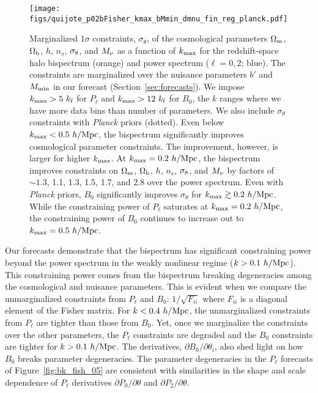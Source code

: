 \begin{figure}
\begin{center}
    \texttt{[image: figs/quijote\_p02bFisher\_kmax\_bMmin\_dmnu\_fin\_reg\_planck.pdf]} 
    \caption{Marginalized $1\sigma$ constraints, $\sigma_\theta$, of the cosmological 
    parameters $\Omega_{\rm m}$, $\Omega_{\rm b}$, $h$, $n_s$, $\sigma_8$, and $M_\nu$ as a function 
    of $k_{\rm max}$ for the redshift-space halo bispectrum (orange) and power 
    spectrum ($\ell = 0, 2$; blue). The constraints are marginalized over the nuisance parameters 
    $b'$ and $M_{\rm min}$ in our forecast (Section~\ref{sec:forecasts}). We impose 
    $k_{\rm max} > 5~k_{\rm f}$ for $P_\ell$ and $k_{\rm max} > 12~k_{\rm f}$ 
    for $B_0$, the $k$ ranges where we have more data bins than number of parameters. 
    We also include $\sigma_\theta$ constraints with {\em Planck} priors (dotted). 
    Even below $k_{\rm max} < 0.5~h/{\rm Mpc}$, the bispectrum significantly 
    improves cosmological parameter constraints. The improvement, however, is larger 
    for higher $k_{\rm max}$. At $k_{\rm max} = 0.2~h/{\rm Mpc}$, the bispectrum 
    improves constraints on $\Omega_{\rm m}$, $\Omega_{\rm b}$, $h$, $n_s$, $\sigma_8$, and $M_\nu$ by factors 
    of $\sim 1.3$, 1.1, 1.3, 1.5, 1.7, and 2.8 over the power spectrum. Even with 
    {\em Planck} priors, $B_0$ significantly improves $\sigma_\theta$ for $k_{\rm max} \gtrsim 0.2~h/{\rm Mpc}$. 
    While the constraining power of $P_\ell$ saturates at $k_{\rm max} = 0.2~h/{\rm Mpc}$,
    the constraining power of $B_0$ continues to increase out to $k_{\rm max} = 0.5~h/{\rm Mpc}$.}
\label{fig:fish_kmax}
\end{center}
\end{figure}
Our forecasts demonstrate that the bispectrum has significant constraining power 
beyond the power spectrum in the weakly nonlinear regime ($k > 0.1~h/{\rm Mpc}$). 
This constraining power 
comes from the bispectrum breaking degeneracies among the cosmological and 
nuisance parameters. This is evident when we compare the unmarginalized 
constraints from $P_\ell$ and $B_0$: $1/\sqrt{F_{ii}}$ where $F_{ii}$ is a 
diagonal element of the Fisher matrix. For $k < 0.4~h/{\rm Mpc}$, the unmarginalized 
constraints from $P_\ell$ are tighter than those from $B_0$. Yet, once we 
marginalize the constraints over the other parameters, the $P_\ell$ constraints 
are degraded and the $B_0$ constraints are tighter for $k > 0.1~h/{\rm Mpc}$. The derivatives, 
$\partial B_0/\partial \theta_i$, also shed light on how $B_0$ breaks parameter 
degeneracies. The parameter degeneracies in the $P_\ell$ forecasts of Figure~\ref{fig:bk_fish_05} 
are consistent with similarities in the shape and scale dependence of 
$P_\ell$ derivatives $\partial P_0/\partial \theta$ and $\partial P_2/\partial \theta$. 


